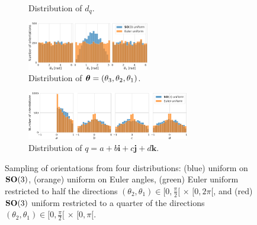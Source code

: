 \begin{figure}[ht!]
\begin{minipage}{.62\linewidth}
\begin{subfigure}[b]{0.35\linewidth}
            \caption{Distribution of $d_q$.}%
            \label{fig:orientation-sampling:distances}
            \vspace{0.2cm}
        \end{subfigure}
        \hfill
        \begin{subfigure}[b]{0.63\linewidth}
            \centering
            \includegraphics[height=2.1cm]{figures/uniform_quaternions_vs_angles_ang.pdf}
            \caption{Distribution of ${\boldsymbol{\theta}} = (\theta_3,\theta_2,\theta_1)$.}%
            \label{fig:orientation-sampling:angles}
            \vspace{0.2cm}
        \end{subfigure}
        \begin{subfigure}[b]{0.97\linewidth}
            \centering
            \includegraphics[height=2.1cm]{figures/uniform_quaternions_vs_angles_q.pdf}
            \caption{Distribution of $q = a + b\boldsymbol{i} + c\boldsymbol{j} + d\boldsymbol{k}$.}%
            \label{fig:orientation-sampling:quaternions}
        \end{subfigure}
    \end{minipage}
    \caption{%
        Sampling of orientations from four distributions:
        (blue) uniform on $\mathrm{\mathbf{SO}}(3)$, (orange) uniform on Euler angles, (green) Euler uniform restricted to half the directions $(\theta_2, \theta_1) \in [0,\frac{\pi}{2}[ \, \times \, [0,2\pi[$, and (red) $\mathrm{\mathbf{SO}}(3)$ uniform restricted to a quarter of the directions $(\theta_2, \theta_1) \in [0,\frac{\pi}{2}[ \, \times \, [0,\pi[$.
    }\label{fig:orientation-sampling}
\end{figure}

